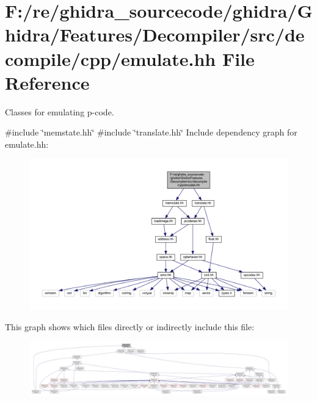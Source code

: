 \hypertarget{emulate_8hh}{}\section{F\+:/re/ghidra\+\_\+sourcecode/ghidra/\+Ghidra/\+Features/\+Decompiler/src/decompile/cpp/emulate.hh File Reference}
\label{emulate_8hh}


Classes for emulating p-\/code.  


{\ttfamily \#include \char`\"{}memstate.\+hh\char`\"{}}\newline
{\ttfamily \#include \char`\"{}translate.\+hh\char`\"{}}\newline
Include dependency graph for emulate.\+hh\+:
\nopagebreak
\begin{figure}[H]
\begin{center}
\leavevmode
\includegraphics[width=350pt]{emulate_8hh__incl}
\end{center}
\end{figure}
This graph shows which files directly or indirectly include this file\+:
\nopagebreak
\begin{figure}[H]
\begin{center}
\leavevmode
\includegraphics[width=350pt]{emulate_8hh__dep__incl}
\end{center}
\end{figure}
